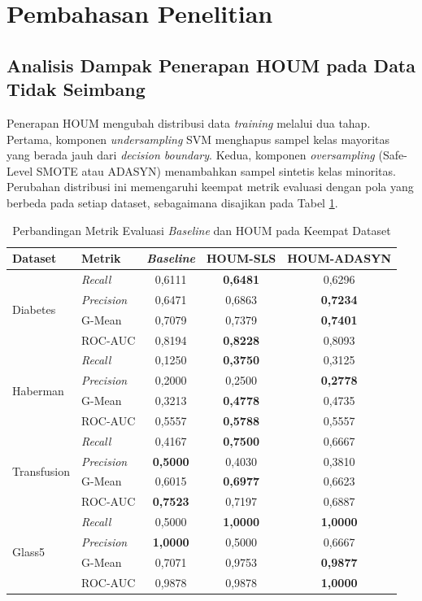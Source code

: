 \section{Pembahasan Penelitian} \label{IV.Pembahasan}

\subsection{Analisis Dampak Penerapan HOUM pada Data Tidak Seimbang} \label{IV.Dampak_HOUM}
Penerapan HOUM mengubah distribusi data \textit{training} melalui dua tahap. Pertama, komponen \textit{undersampling} SVM menghapus sampel kelas mayoritas yang berada jauh dari \textit{decision boundary}. Kedua, komponen \textit{oversampling} (Safe-Level SMOTE atau ADASYN) menambahkan sampel sintetis kelas minoritas. Perubahan distribusi ini memengaruhi keempat metrik evaluasi dengan pola yang berbeda pada setiap dataset, sebagaimana disajikan pada Tabel \ref{table:4.dampak_houm}. \par

\begin{table}[H]
\centering
\caption{Perbandingan Metrik Evaluasi \textit{Baseline} dan HOUM pada Keempat Dataset}
\label{table:4.dampak_houm}
\footnotesize
\begin{tabular}{|l|l|c|c|c|}
\hline
\textbf{Dataset} & \textbf{Metrik} & \textbf{\textit{Baseline}} & \textbf{HOUM-SLS} & \textbf{HOUM-ADASYN} \\
\hline
\multirow{4}{*}{Diabetes} & \textit{Recall} & 0,6111 & \textbf{0,6481} & 0,6296 \\
 & \textit{Precision} & 0,6471 & 0,6863 & \textbf{0,7234} \\
 & G-Mean & 0,7079 & 0,7379 & \textbf{0,7401} \\
 & ROC-AUC & 0,8194 & \textbf{0,8228} & 0,8093 \\
\hline
\multirow{4}{*}{Haberman} & \textit{Recall} & 0,1250 & \textbf{0,3750} & 0,3125 \\
 & \textit{Precision} & 0,2000 & 0,2500 & \textbf{0,2778} \\
 & G-Mean & 0,3213 & \textbf{0,4778} & 0,4735 \\
 & ROC-AUC & 0,5557 & \textbf{0,5788} & 0,5557 \\
\hline
\multirow{4}{*}{Transfusion} & \textit{Recall} & 0,4167 & \textbf{0,7500} & 0,6667 \\
 & \textit{Precision} & \textbf{0,5000} & 0,4030 & 0,3810 \\
 & G-Mean & 0,6015 & \textbf{0,6977} & 0,6623 \\
 & ROC-AUC & \textbf{0,7523} & 0,7197 & 0,6887 \\
\hline
\multirow{4}{*}{Glass5} & \textit{Recall} & 0,5000 & \textbf{1,0000} & \textbf{1,0000} \\
 & \textit{Precision} & \textbf{1,0000} & 0,5000 & 0,6667 \\
 & G-Mean & 0,7071 & 0,9753 & \textbf{0,9877} \\
 & ROC-AUC & 0,9878 & 0,9878 & \textbf{1,0000} \\
\hline
\end{tabular}
\end{table}

